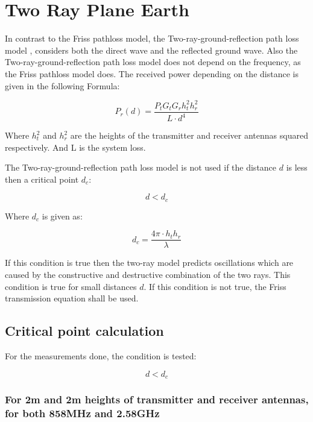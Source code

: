 \section{Two Ray Plane Earth}
In contrast to the Friss pathloss model, the Two-ray-ground-reflection path loss model \citep{two_ray}, considers both the direct wave and the reflected ground wave. Also the Two-ray-ground-reflection path loss model does not depend on the frequency, as the Friss pathloss model does. The received power depending on the distance is given in the following Formula:

\begin{equation}
P_r(d) = \frac{P_t G_t G_r h^2_t h^2_r}{L \cdot d^4}
\label{two_ray_model}
\end{equation}

Where $h^2_t$ and $h^2_r$ are the heights of the transmitter and receiver antennas squared respectively. And L is the system loss. 

The Two-ray-ground-reflection path loss model is not used if the distance $d$ is less then a critical point $d_{c}$: 

\begin{equation}
d<d_{c}
\label{two_ray_cond}
\end{equation}

Where $d_{c}$ is given as:

\begin{equation}
d_{c} = \frac{4\pi \cdot h_t h_r}{\lambda}
\label{critical_fac_dc}
\end{equation}

If this condition is true then the two-ray model predicts oscillations which are caused by the constructive and destructive combination of the two rays. This condition is true for small distances $d$. If this condition is not true, the Friss transmission equation shall be used. 

\subsection{Critical point calculation}
For the measurements done, the condition is tested:

\begin{equation}
d<d_{c}
\label{two_ray_cond_1}
\end{equation}

\subsubsection{For 2m and 2m heights of transmitter and receiver antennas, for both 858MHz and 2.58GHz}

